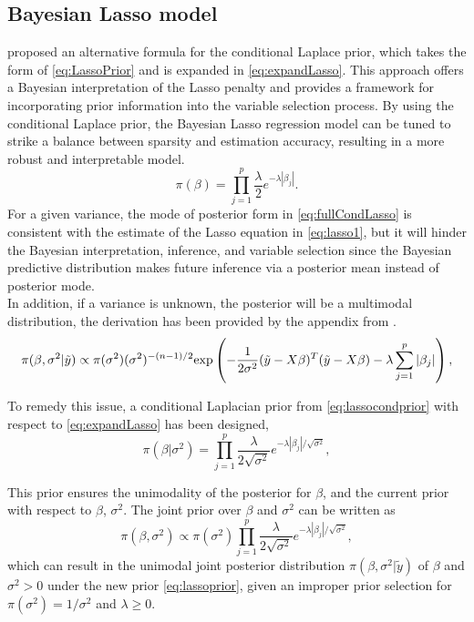 \subsection{Bayesian Lasso model}
\cite{park_casella_2008} proposed an alternative formula for the conditional Laplace prior, which takes the form of \autoref{eq:LassoPrior} and is expanded in \autoref{eq:expandLasso}. This approach offers a Bayesian interpretation of the Lasso penalty and provides a framework for incorporating prior information into the variable selection process. By using the conditional Laplace prior, the Bayesian Lasso regression model can be tuned to strike a balance between sparsity and estimation accuracy, resulting in a more robust and interpretable model.\\
\begin{equation}
	\label{eq:expandLasso}
	\pi(\beta) = \prod_{j=1}^p \frac{\lambda}{2} e^{-\lambda|\beta_j|}.
\end{equation}
For a given variance, the mode of posterior form in \autoref{eq:fullCondLasso} is consistent with the estimate of the Lasso equation in \autoref{eq:lasso1}, but it will hinder the Bayesian interpretation, inference, and variable selection since the Bayesian predictive distribution makes future inference via a posterior mean instead of posterior mode.\\
In addition, if a variance is unknown, the posterior will be a multimodal distribution, the derivation has been provided by the appendix from \cite{park_casella_2008}.
\begin{equation}
	\label{eq:fullCondLasso}
	\pi(\beta,\sigma^2|\tilde{y}) \propto \pi(\sigma^2)(\sigma^2)^{-(n-1)/2}\textnormal{exp}\left(-\frac{1}{2\sigma^2}(\tilde{y}-X\beta)^T(\tilde{y}-X\beta)-\lambda\sum_{j=1}^p|\beta_j|\right),
\end{equation}

To remedy this issue, a conditional Laplacian prior from \autoref{eq:lassocondprior} with respect to \autoref{eq:expandLasso} has been designed, 
\begin{equation}
	\label{eq:lassocondprior}
	\pi(\beta |\sigma^2) = \prod_{j=1}^p \frac{\lambda}{2\sqrt{\sigma^2}} e^{-\lambda|\beta_j|/\sqrt{\sigma^2}},
\end{equation}

\noindent 
This prior ensures the unimodality of the posterior for $\beta$, and the current prior with respect to $\beta$, $\sigma^2$. The joint prior over $\beta$ and $\sigma^2$
can be written as
\begin{equation}
	\label{eq:lassoprior}
	\pi(\beta,\sigma^2) \propto \pi(\sigma^2) \prod_{j=1}^p \frac{\lambda}{2\sqrt{\sigma^2}} e^{-\lambda|\beta_j|/\sqrt{\sigma^2}},
\end{equation}
which can result in the unimodal joint posterior distribution $\pi(\beta,\sigma^2|\tilde{y})$ of $\beta$ and $\sigma^2 > 0$ under the new prior \autoref{eq:lassoprior}, given an improper prior selection for $\pi(\sigma^2) = 1/\sigma^2$ and $\lambda \geq 0$.

